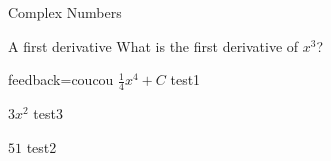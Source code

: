 \documentclass{article}
\begin{document}
\begin{quiz}[ %
	points=1, %
	penalty=0, %
	fraction=0, %
	] {Complex Numbers}

\begin{multi}[points=3]{A first derivative} %
What is the first derivative of $x^3$?
\item[feedback={coucou}] $\frac{1}{4} x^4+C$ \feedback test1
\item* $3x^2$ \feedback test3%
\item[] $51$ \feedback test2
\end{multi}
\end{quiz}
\end{document}
